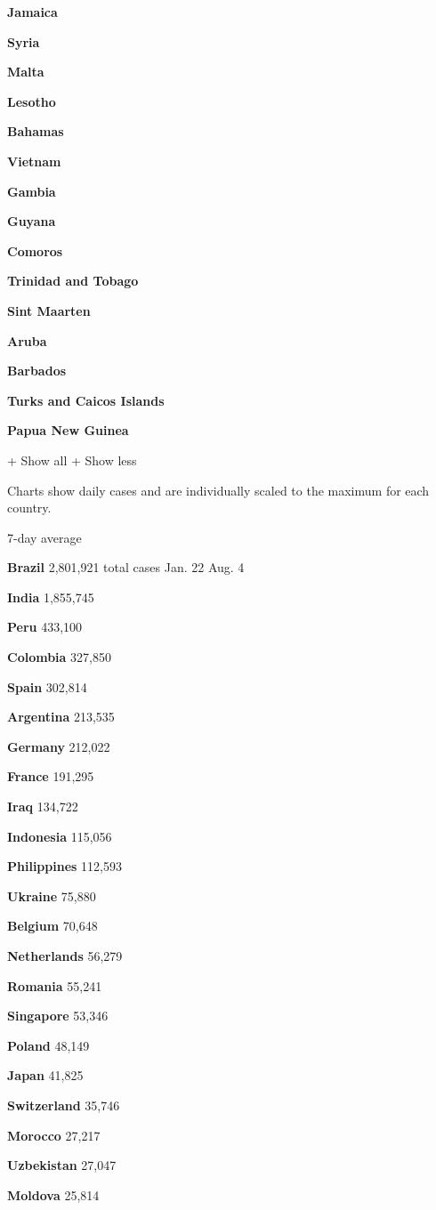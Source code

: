 \textbf{Jamaica}

\textbf{Syria}

\textbf{Malta}

\textbf{Lesotho}

\textbf{Bahamas}

\textbf{Vietnam}

\textbf{Gambia}

\textbf{Guyana}

\textbf{Comoros}

\textbf{Trinidad and Tobago}

\textbf{Sint Maarten}

\textbf{Aruba}

\textbf{Barbados}

\textbf{Turks and Caicos Islands}

\textbf{Papua New Guinea}

+ Show all + Show less

Charts show daily cases and are individually scaled to the maximum for
each country.

7-day average

\textbf{Brazil} 2,801,921 total cases Jan. 22 Aug. 4

\textbf{India} 1,855,745

\textbf{Peru} 433,100

\textbf{Colombia} 327,850

\textbf{Spain} 302,814

\textbf{Argentina} 213,535

\textbf{Germany} 212,022

\textbf{France} 191,295

\textbf{Iraq} 134,722

\textbf{Indonesia} 115,056

\textbf{Philippines} 112,593

\textbf{Ukraine} 75,880

\textbf{Belgium} 70,648

\textbf{Netherlands} 56,279

\textbf{Romania} 55,241

\textbf{Singapore} 53,346

\textbf{Poland} 48,149

\textbf{Japan} 41,825

\textbf{Switzerland} 35,746

\textbf{Morocco} 27,217

\textbf{Uzbekistan} 27,047

\textbf{Moldova} 25,814

